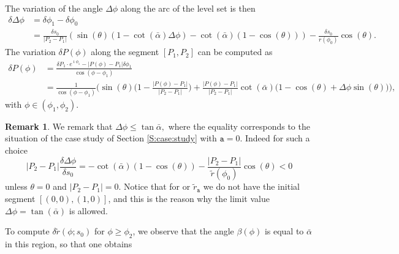\documentclass[reqno]{amsart}
\theoremstyle{definition} \newtheorem{definition}{Definition}[section]
\theoremstyle{definition} \newtheorem{remark}[definition]{Remark}
\theoremstyle{plain} \newtheorem{lemma}[definition]{Lemma}
\theoremstyle{plain} \newtheorem{proposition}[definition]{Proposition}
\theoremstyle{plain} \newtheorem{theorem}[definition]{Theorem}
\theoremstyle{plain} \newtheorem{corollary}[definition]{Corollary}
\theoremstyle{definition} \newtheorem{example}[definition]{Example}
\theoremstyle{plain} \newtheorem{claim}[clai]{Claim}
\theoremstyle{definition} \newtheorem{assumption}[definition]{Assumption}
\theoremstyle{definition} \newtheorem{observation}[definition]{Observation}
\newcommand{\1}{\mathbbm 1}
\renewcommand{\i}{\imath}
\numberwithin{equation}{section} %
\theoremstyle{plain} \newtheorem*{theorem*}{Theorem}
\theoremstyle{plain} \newtheorem{mthm}[maintheorem]{Main Theorem}
\theoremstyle{plain} \newtheorem*{mthm*}{Main Theorem}
\theoremstyle{plain} \newtheorem*{conjecture*}{Conjecture}
\theoremstyle{plain} \newtheorem{conjecture}[definition]{Conjecture}
\theoremstyle{plain} \newtheorem*{problem*}{Problem}
\begin{document}
The variation of the angle $\Delta \phi$ along the arc of the level set is then
\begin{equation}
\label{Equa:delta_Delta_phi}
\begin{split}
\delta \Delta \phi &= \delta\phi_1-\delta\phi_0 \\
&= \frac{\delta s_0}{|P_2-P_1|} \left( \sin(\theta) (1 - \cot(\bar \alpha) \Delta \phi) - \cot(\bar \alpha) (1 - \cos(\theta)) \right) - \frac{\delta s_0}{r(\phi_0)} \cos(\theta).
\end{split}
\end{equation}
The variation $\delta P(\phi)$ along the segment $[P_1,P_2]$ can be computed as 
\begin{align*}
\delta P(\phi) &= \frac{\delta P_1 \cdot e^{\i \phi_1} - |P(\phi) - P_1| \delta \phi_1}{\cos(\phi - \phi_1)} \\
&= \frac{1}{\cos(\phi - \phi_1)} \bigg( \sin(\theta) \bigg(1 - \frac{|P(\phi) - P_1|}{|P_2 - P_1|} \bigg) + \frac{|P(\phi) - P_1|}{|P_2 - P_1|} \cot(\bar \alpha) \big( 1 - \cos(\theta) + \Delta \phi \sin(\theta) \big) \bigg),
\end{align*}
with $\phi \in (\phi_1,\phi_2)$.

\begin{remark}
\label{rmk:deltaphi:max}
We remark that $\Delta\phi\leq\tan\bar\alpha,$ where the equality corresponds to the situation of the case study of Section \ref{S:case:study} with $\mathtt a = 0$. Indeed for such a choice
\begin{equation*}
|P_2 - P_1| \frac{\delta \Delta \phi}{\delta s_0} = - \cot(\bar \alpha) (1 - \cos(\theta)) - \frac{|P_2 - P_1|}{\tilde r(\phi_0)} \cos(\theta) < 0
\end{equation*}
unless $\theta = 0$ and $|P_2 - P_1| = 0$. Notice that for or $\tilde r_{\mathtt a}$ we do not have the initial segment $[(0,0),(1,0)]$, and this is the reason why the limit value $\Delta \phi = \tan(\bar \alpha)$ is allowed.
\end{remark}

To compute $\delta \tilde r(\phi;s_0)$ for $\phi \geq \phi_2$, we observe that the angle $\beta(\phi)$ is equal to $\bar \alpha$ in this region, so that one obtains
\end{document}

